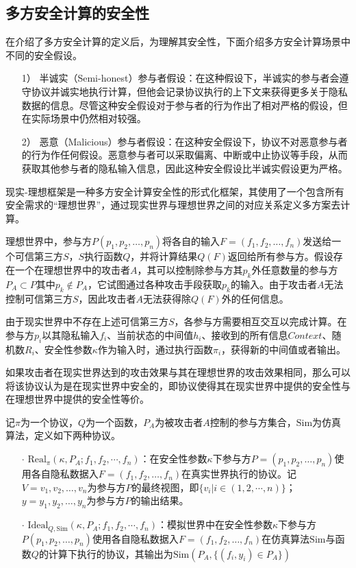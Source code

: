 \subsection{多方安全计算的安全性}
在介绍了多方安全计算的定义后，为理解其安全性，下面介绍多方安全计算场景中不同的安全假设。

\begin{itemize}
	\item [1）]
	半诚实（Semi-honest）参与者假设：在这种假设下，半诚实的参与者会遵守协议并诚实地执行计算，但他会记录协议执行的上下文来获得更多关于隐私数据的信息。尽管这种安全假设对于参与者的行为作出了相对严格的假设，但在实际场景中仍然相对较强。
	\item [2）]
	恶意（Malicious）参与者假设：在这种安全假设下，协议不对恶意参与者的行为作任何假设。恶意参与者可以采取偏离、中断或中止协议等手段，从而获取其他参与者的隐私输入信息，因此这种安全假设比半诚实假设更为严格。
\end{itemize}

现实-理想框架是一种多方安全计算安全性的形式化框架，其使用了一个包含所有安全需求的“理想世界”，通过现实世界与理想世界之间的对应关系定义多方案去计算。

理想世界中，参与方$P(p_1, p_2, \dots, p_n)$将各自的输入$F=(f_1, f_2, \dots, f_n)$发送给一个可信第三方$S$，$S$执行函数$Q$，并将计算结果$Q(F)$返回给所有参与方。假设存在一个在理想世界中的攻击者$A$，其可以控制除参与方其$p_k$外任意数量的参与方$P_A\subset P$其中$p_k\notin P_A$，它试图通过各种攻击手段获取$p_k$的输入。由于攻击者$A$无法控制可信第三方$S$，因此攻击者$A$无法获得除$Q(F)$外的任何信息。

由于现实世界中不存在上述可信第三方$S$，各参与方需要相互交互以完成计算。在参与方$p_i$以其隐私输入$f_i$、当前状态的中间值$h_i$、接收到的所有信息$Context$、随机数$R_i$、安全性参数$\kappa$作为输入时，通过执行函数$\pi_i$，获得新的中间值或者输出。

如果攻击者在现实世界达到的攻击效果与其在理想世界的攻击效果相同，那么可以将该协议认为是在现实世界中安全的，即协议使得其在现实世界中提供的安全性与在理想世界中提供的安全性等价。

\begin{definition}{}
	记$\pi$为一个协议，$Q$为一个函数，$P_A$为被攻击者$A$控制的参与方集合，$\text{Sim}$为仿真算法，定义如下两种协议。
	\begin{itemize}
		\item [$\cdot$]
			$\text{Real}_\pi(\kappa,P_A;f_1,f_2,\cdots,f_n)$：在安全性参数$\kappa$下参与方$P=(p_1, p_2, \dots, p_n)$使用各自隐私数据入$F=(f_1, f_2, \dots, f_n)$在真实世界执行的协议。记$V={v_1, v_2, \dots, v_n}$为参与方$P$的最终视图，即$\{v_i|i\in (1,2,\cdots,n)\}$；$y={y_1, y_2, \dots, y_n}$为参与方$P$的输出结果。
		\item [$\cdot$]
			$\text{Ideal}_{Q,\text{Sim}}(\kappa,P_A;f_1,f_2,\cdots,f_n)$：模拟世界中在安全性参数$\kappa$下参与方$P(p_1, p_2, \dots, p_n)$使用各自隐私数据入$F=(f_1, f_2, \dots, f_n)$在仿真算法$\text{Sim}$与函数$Q$的计算下执行的协议，其输出为$\text{Sim}(P_A,\{(f_i,y_i)\in P_A\})$			
	\end{itemize}

\end{definition}

